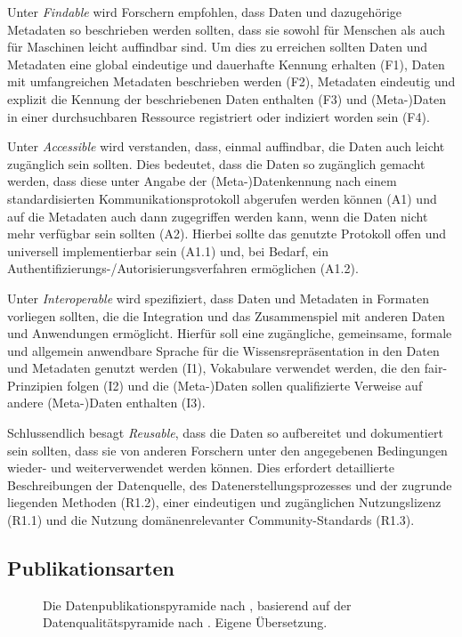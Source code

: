 Unter \textit{Findable} wird Forschern empfohlen, dass Daten und dazugehörige Metadaten so beschrieben werden sollten, dass sie sowohl für Menschen als auch für Maschinen leicht auffindbar sind.
Um dies zu erreichen sollten Daten und Metadaten eine global eindeutige und dauerhafte Kennung erhalten (F1), Daten mit umfangreichen Metadaten beschrieben werden (F2), Metadaten eindeutig und explizit die Kennung der beschriebenen Daten enthalten (F3) und (Meta-)Daten in einer durchsuchbaren Ressource registriert oder indiziert worden sein (F4).

Unter \textit{Accessible} wird verstanden, dass, einmal auffindbar, die Daten auch leicht zugänglich sein sollten.
Dies bedeutet, dass die Daten so zugänglich gemacht werden, dass diese unter Angabe der (Meta-)Datenkennung nach einem standardisierten Kommunikationsprotokoll abgerufen werden können (A1) und auf die Metadaten auch dann zugegriffen werden kann, wenn die Daten nicht mehr verfügbar sein sollten (A2).
Hierbei sollte das genutzte Protokoll offen und universell implementierbar sein (A1.1) und, bei Bedarf, ein Authentifizierungs-/Autorisierungsverfahren ermöglichen (A1.2).

Unter \textit{Interoperable} wird spezifiziert, dass Daten und Metadaten in Formaten vorliegen sollten, die die Integration und das Zusammenspiel mit anderen Daten und Anwendungen ermöglicht.
Hierfür soll eine zugängliche, gemeinsame, formale und allgemein anwendbare Sprache für die Wissensrepräsentation in den Daten und Metadaten genutzt werden (I1), Vokabulare verwendet werden, die den \gls{fair}-Prinzipien folgen (I2) und die (Meta-)Daten sollen qualifizierte Verweise auf andere (Meta-)Daten enthalten (I3).

Schlussendlich besagt \textit{Reusable}, dass die Daten so aufbereitet und dokumentiert sein sollten, dass sie von anderen Forschern unter den angegebenen Bedingungen wieder- und weiterverwendet werden können.
Dies erfordert detaillierte Beschreibungen der Datenquelle, des Datenerstellungsprozesses und der zugrunde liegenden Methoden (R1.2), einer eindeutigen und zugänglichen Nutzungslizenz (R1.1) und die Nutzung domänenrelevanter Community-Standards (R1.3).

\subsection{Publikationsarten}\label{sec:forschungsstand-basics-publicationtypes}
\autocite{ReillyEtAl2011}
\begin{figure}[!htbp]
    \centering
    \resizebox{.8\textwidth}{!}{}
    \caption{Die Datenpublikationspyramide nach \citeauthor{ReillyEtAl2011} \autocite{ReillyEtAl2011}, basierend auf der Datenqualitätspyramide nach \citeauthor{Gray2009} \autocite{Gray2009}. Eigene Übersetzung.}
    \label{fig:data-pyramid}
\end{figure}

